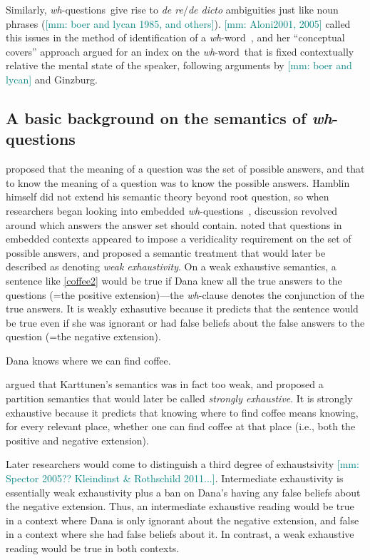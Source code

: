 \documentclass[12pt,letterpaper,table,svgnames,dvipsnames]{article}
\newcommand{\mm}[1]{\textcolor{teal}{[mm: #1]}}
\newcommand{\whqs}{\emph{wh}-questions~}
\newcommand{\whw}{\emph{wh}-word~}
\begin{document}
Similarly, \whqs give rise to \emph{de re}/\emph{de dicto} ambiguities just like noun phrases (\mm{boer and lycan 1985, and others}\cite{heim1994,groenstok1984}). \mm{Aloni2001, 2005} called this issues in the method of identification of a \whw, and her ``conceptual covers'' approach argued for an index on the \whw that is fixed contextually relative the mental state of the speaker, following arguments by \mm{boer and lycan} and Ginzburg. 


\subsection{A basic background on the semantics of \whqs}


 proposed that the meaning of a question was the set of possible answers, and that to know the meaning of a question was to know the possible answers. Hamblin himself did not extend his semantic theory beyond root question, so when researchers began looking into embedded \whqs, discussion revolved around which answers the answer set should contain.  noted that questions in embedded contexts appeared to impose a veridicality requirement on the set of possible answers, and proposed a semantic treatment that would later be described as denoting \emph{weak exhaustivity}. On a weak exhaustive semantics, a sentence like \ref{coffee2} would be true if Dana knew all the true answers to the questions (=the positive extension)---the \emph{wh}-clause denotes the conjunction of the true answers. It is weakly exhasutive because it predicts that the sentence would be true even if she was ignorant or had false beliefs about the false answers to the question (=the negative extension).

\begin{exe}
\ex Dana knows where we can find coffee. \label{coffee2}
\end{exe}

 argued that Karttunen's semantics was in fact too weak, and proposed a partition semantics that would later be called \emph{strongly exhaustive}. It is strongly exhaustive because it predicts that knowing where to find coffee means knowing, for every relevant place, whether one can find coffee at that place (i.e., both the positive and negative extension).

Later researchers would come to distinguish a third degree of exhaustsivity \mm{Spector 2005?? Kleindinst \& Rothschild 2011...}. Intermediate exhaustivity is essentially weak exhaustivity plus a ban on Dana's having any false beliefs about the negative extension. Thus, an intermediate exhaustive reading would be true in a context where Dana is only ignorant about the negative extension, and false in a context where she had false beliefs about it. In contrast, a weak exhaustive reading would be true in both contexts.
\end{document}
